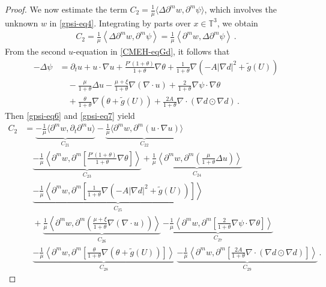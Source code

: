 \documentclass[10pt,a4paper]{amsart}
\def\no{\nonumber}
\def\p{\partial}
\begin{document}
\begin{proof}
We now estimate the term $C_2 = \frac{1}{\mu} \langle \Delta \p^m w, \p^m \psi \rangle$, which involves the unknown $w$ in \eqref{gpsi-eq4}. Integrating by parts over $x\in \mathbb{T}^3$, we obtain
\begin{equation}\label{gpsi-eq6}
\begin{aligned}
C_2=\frac{1}{\mu} \left\langle \Delta \partial^m w, \partial^m \psi \right\rangle=\frac{1}{\mu} \left\langle  \partial^m w, \Delta\partial^m \psi \right\rangle  \,.
\end{aligned}
\end{equation}
From the second $u$-equation in \eqref{CMEH-eqGd}, it follows that
\begin{align}\label{gpsi-eq7}
\no -\Delta \psi &= \partial_t u + u \cdot \nabla u + \frac{P'(1+\theta)}{1+\theta} \nabla \theta + \frac{1}{1+\theta} \nabla \left(-A |\nabla d|^2 + \tilde{g}(U)\right) \\
\no & \quad -\frac{\mu}{1+\theta} \Delta u - \frac{\mu+\xi}{1+\theta} \nabla (\nabla \cdot u) + \frac{2}{1+\theta} \nabla {\psi} \cdot \nabla \theta \\
& \quad + \frac{\theta}{1+\theta} \nabla \left(\theta + \tilde{g}(U)\right) + \frac{2A}{1+\theta} \nabla \cdot \left( \nabla d \odot \nabla d \right)
 \,.
\end{align}
 Then \eqref{gpsi-eq6} and \eqref{gpsi-eq7} yield
 \begin{equation}\label{gpsi-eq8}
\begin{aligned}
C_2 & = \underset{ C_{21} }{ \underbrace{ - \frac{1}{\mu} \langle \p^m w, \p_t \p^m u \rangle }} - \underset{ C_{22} }{ \underbrace{ \frac{1}{\mu} \langle \p^m w, \p^m ( u \cdot \nabla u ) \rangle}} \\
& \quad \underset{ C_{23} }{ \underbrace{ - \frac{1}{\mu} \left\langle \partial^m w, \partial^m \left[ \frac{ P' ( 1 + \theta ) }{ 1 + \theta } \nabla \theta \right] \right\rangle }} + \underset{ C_{24} }{ \underbrace{ \frac{1}{\mu} \left\langle \partial^m w, \partial^m \left( \frac{\mu}{ 1+\theta } \Delta u \right) \right\rangle }} \\
& \quad \underset{ C_{25} }{ \underbrace{ - \frac{1}{\mu} \left\langle \partial^m w, \partial^m \left[ \frac{1}{ 1+\theta } \nabla \left( - A | \nabla d |^2 + \tilde{g} (U) \right) \right] \right\rangle }} \\
& \quad + \underset{ C_{26} }{ \underbrace{ \frac{1}{\mu} \left\langle \partial^m w, \partial^m \left( \frac{ \mu + \xi }{ 1 + \theta } \nabla ( \nabla \cdot u ) \right) \right\rangle }} \ \underset{ C_{27} }{ \underbrace{ - \frac{1}{\mu} \left\langle \partial^m w, \partial^m \left[ \frac{2}{ 1 + \theta } \nabla \psi \cdot \nabla \theta \right] \right\rangle }} \\
& \quad \underset{ C_{28} }{ \underbrace{ - \frac{1}{\mu} \left\langle \partial^m w, \partial^m \left[ \frac{\theta}{1+\theta} \nabla \left( \theta + \tilde{g} (U) \right) \right] \right\rangle }} \ \underset{ C_{29} }{ \underbrace{ - \frac{1}{\mu} \left\langle \partial^m w, \partial^m \left[ \frac{2A}{ 1 + \theta } \nabla \cdot \left( \nabla d \odot \nabla d \right) \right] \right\rangle }} \,.
\end{aligned}
\end{equation}


\end{proof}
\end{document}
